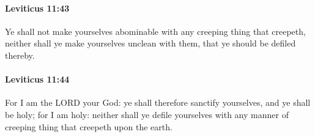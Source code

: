 		\paragraph{Leviticus 11:43} %
			\label{LEVITICUS-11-43}

			Ye shall not make yourselves abominable with any creeping thing that creepeth, neither shall ye make yourselves unclean with them, that ye should be defiled thereby.


		\paragraph{Leviticus 11:44} %
			\label{LEVITICUS-11-44}

			For I am the LORD your God: ye shall therefore sanctify yourselves, and ye shall be holy; for I am holy: neither shall ye defile yourselves with any manner of creeping thing that creepeth upon the earth.

